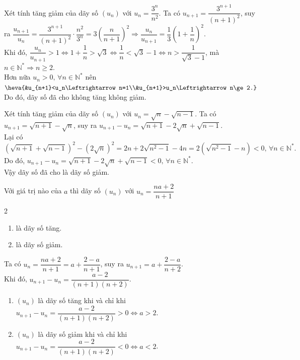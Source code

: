 \begin{vd}%
	Xét tính tăng giảm của dãy số $(u_n)$ với $u_n=\dfrac{3^n}{n^2}$.
	\loigiai 
	{
		Ta có $u_{n+1}=\dfrac{3^{n+1}}{(n+1)^2}$, suy ra $\dfrac{u_{n+1}}{u_n}=\dfrac{3^{n+1}}{(n+1)^2}\cdot \dfrac{n^2}{3^n}=3\left(\dfrac{n}{n+1}\right)^2\Rightarrow \dfrac{u_n}{u_{n+1}}=\dfrac{1}{3}\left(1+\dfrac{1}{n}\right)^2$.\\
		Khi đó, $\dfrac{u_n}{u_{n+1}}>1\Leftrightarrow 1+\dfrac{1}{n}>\sqrt{3}\Leftrightarrow \dfrac{1}{n}<\sqrt{3}-1\Leftrightarrow n>\dfrac{1}{\sqrt{3}-1}$, mà $n\in\mathbb{N}^*\Rightarrow n\ge 2$.\\
		Hơn nữa $u_n>0,\, \forall n\in\mathbb{N}^*$ nên $\heva{&u_{n+1}<u_n\Leftrightarrow n=1\\&u_{n+1}>u_n\Leftrightarrow n\ge 2.}$\\
		Do đó, dãy số đã cho không tăng không giảm.
	}
\end{vd}

\begin{vd}%
	Xét tính tăng giảm của dãy số $(u_n)$ với $u_n=\sqrt{n}-\sqrt{n-1}$.
	\loigiai 
	{
		Ta có $u_{n+1}=\sqrt{n+1}-\sqrt{n}$, suy ra $u_{n+1}-u_n=\sqrt{n+1}-2\sqrt{n}+\sqrt{n-1}$.\\
		Lại có $$\left(\sqrt{n+1}+\sqrt{n-1}\right)^2-\left(2\sqrt{n}\right)^2=2n+2\sqrt{n^2-1}-4n=2\left(\sqrt{n^2-1}-n\right)<0,\,\forall n\in\mathbb{N}^*.$$
		Do đó, $u_{n+1}-u_n=\sqrt{n+1}-2\sqrt{n}+\sqrt{n-1}<0,\,\forall n\in\mathbb{N}^*$.\\
		Vậy dãy số đã cho là dãy số giảm.
	}
\end{vd}

\begin{vd}%
	Với giá trị nào của $a$ thì dãy số $(u_n)$ với $u_n=\dfrac{na+2}{n+1}$
	\begin{multicols}{2}
		\begin{enumerate}
			\item là dãy số tăng.
			\item là dãy số giảm.
		\end{enumerate}
	\end{multicols}
	\loigiai 
	{
		Ta có $u_n=\dfrac{na+2}{n+1}=a+\dfrac{2-a}{n+1}$, suy ra $u_{n+1}=a+\dfrac{2-a}{n+2}$.\\
		Khi đó, $u_{n+1}-u_n=\dfrac{a-2}{(n+1)(n+2)}$.
	\begin{enumerate}
		\item $(u_n)$ là dãy số tăng khi và chỉ khi $u_{n+1}-u_n=\dfrac{a-2}{(n+1)(n+2)}>0\Leftrightarrow a>2$.
		\item $(u_n)$ là dãy số giảm khi và chỉ khi $u_{n+1}-u_n=\dfrac{a-2}{(n+1)(n+2)}<0\Leftrightarrow a<2$.
	\end{enumerate}
	}
\end{vd}


